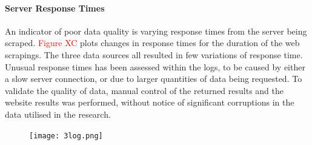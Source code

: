 \documentclass[12pt,a4paper]{article}
\begin{document}
\paragraph{Server Response Times\newline}
An indicator of poor data quality is varying response times from the server being scraped. \textcolor{red}{Figure XC} plots changes in response times for the duration of the web scrapings. The three data sources all resulted in few variations of response time. Unusual response times has been assessed within the logs, to be caused by either a slow server connection, or due to larger quantities of data being requested. To validate the quality of data, manual control of the returned results and the website results was performed, without notice of significant corruptions in the data utilised in the research.
\begin{figure}[H]
  \centering
   \caption{}
   \texttt{[image: 3log.png]} 
  \label{fig:}
\end{figure}
\end{document}
